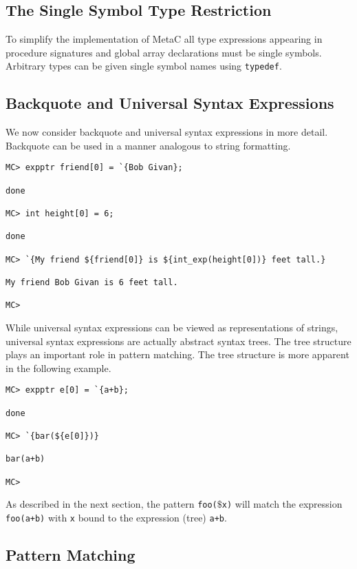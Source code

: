 \documentclass{article}
\begin{document}
\subsection{The Single Symbol Type Restriction}

To simplify the implementation of MetaC all type expressions appearing in procedure signatures and global array declarations must be single symbols.
Arbitrary types can be given single symbol names using {\tt typedef}.

\subsection{Backquote and Universal Syntax Expressions}

We now consider backquote and universal syntax expressions in more detail.  Backquote can be used in a manner analogous to string formatting.

\begin{verbatim}
MC> expptr friend[0] = `{Bob Givan};

done

MC> int height[0] = 6;

done

MC> `{My friend ${friend[0]} is ${int_exp(height[0])} feet tall.}

My friend Bob Givan is 6 feet tall.

MC> 
\end{verbatim}

While universal syntax expressions can be viewed as representations of strings, universal syntax
expressions are actually abstract syntax trees. The tree structure
plays an important role in pattern matching. The tree structure is
more apparent in the following example.

\begin{verbatim}
MC> expptr e[0] = `{a+b};

done

MC> `{bar(${e[0]})}

bar(a+b)

MC>
\end{verbatim}

As described in the next section, the pattern {\tt foo($\$$x)} will match the expression {\tt foo(a+b)} with {\tt x} bound to the expression (tree) {\tt a+b}.

\subsection{Pattern Matching}
\end{document}
